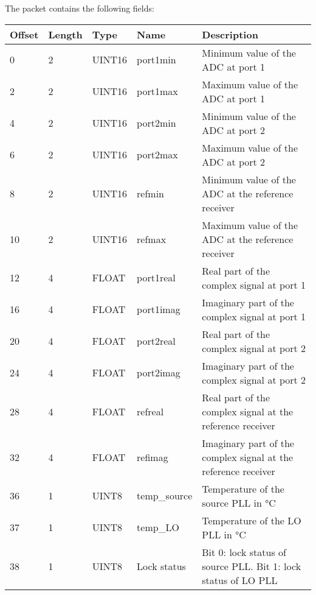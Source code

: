 \documentclass[a4paper,11pt]{article}
\begin{document}
The packet contains the following fields:
\begin{ThreePartTable}
\setlength\tabcolsep{3pt}

\begin{longtable}{p{} |  p{}  |  p{}| p{} | p{}}
\toprule
\textbf{Offset} &\textbf{Length} &\textbf{Type} & \textbf{Name} &\textbf{Description} \\ 
\hline
\endhead
\midrule[\heavyrulewidth]
\endfoot  
\midrule[\heavyrulewidth]
\endlastfoot

0 & 2 & UINT16 & port1min & Minimum value of the ADC at port 1 \\
2 & 2 & UINT16 & port1max & Maximum value of the ADC at port 1 \\
4 & 2 & UINT16 & port2min & Minimum value of the ADC at port 2 \\
6 & 2 & UINT16 & port2max & Maximum value of the ADC at port 2 \\
8 & 2 & UINT16 & refmin & Minimum value of the ADC at the reference receiver \\
10 & 2 & UINT16 & refmax & Maximum value of the ADC at the reference receiver \\
12 & 4 & FLOAT & port1real & Real part of the complex signal at port 1 \\
16 & 4 & FLOAT & port1imag & Imaginary part of the complex signal at port 1 \\
20 & 4 & FLOAT & port2real & Real part of the complex signal at port 2 \\
24 & 4 & FLOAT & port2imag & Imaginary part of the complex signal at port 2 \\
28 & 4 & FLOAT & refreal & Real part of the complex signal at the reference receiver \\
32 & 4 & FLOAT & refimag & Imaginary part of the complex signal at the reference receiver \\
36 & 1 & UINT8 & temp\_source & Temperature of the source PLL in \si{\celsius} \\
37 & 1 & UINT8 & temp\_LO & Temperature of the LO PLL in \si{\celsius} \\
38 & 1 & UINT8 & Lock status & Bit 0: lock status of source PLL. Bit 1: lock status of LO PLL \\
\end{longtable}   
\end{ThreePartTable}
\end{document}

